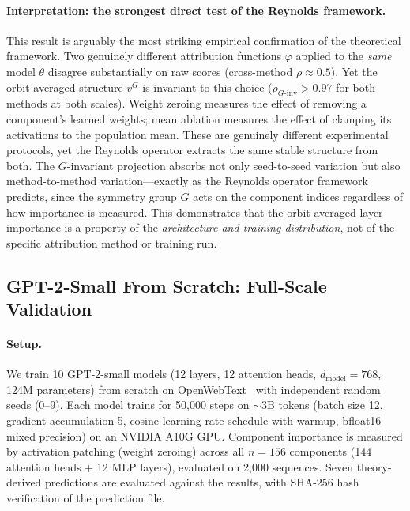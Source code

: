 \documentclass{article}
\begin{document}
\paragraph{Interpretation: the strongest direct test of the Reynolds framework.}
This result is arguably the most striking empirical confirmation of the theoretical framework. Two genuinely different attribution functions $\varphi$ applied to the \emph{same} model $\theta$ disagree substantially on raw scores (cross-method $\rho \approx 0.5$). Yet the orbit-averaged structure $v^G$ is invariant to this choice ($\rho_{G\text{-inv}} > 0.97$ for both methods at both scales). Weight zeroing measures the effect of removing a component's learned weights; mean ablation measures the effect of clamping its activations to the population mean. These are genuinely different experimental protocols, yet the Reynolds operator extracts the same stable structure from both. The $G$-invariant projection absorbs not only seed-to-seed variation but also method-to-method variation---exactly as the Reynolds operator framework predicts, since the symmetry group $G$ acts on the component indices regardless of how importance is measured. This demonstrates that the orbit-averaged layer importance is a property of the \emph{architecture and training distribution}, not of the specific attribution method or training run.

\subsection{GPT-2-Small From Scratch: Full-Scale Validation}
\label{sec:gpt2-from-scratch}

\paragraph{Setup.}
We train 10 GPT-2-small models (12 layers, 12 attention heads, $d_{\text{model}} = 768$, 124M parameters) from scratch on OpenWebText~\citep{gokaslan2019openwebtext} with independent random seeds (0--9). Each model trains for 50{,}000 steps on ${\sim}3$B tokens (batch size 12, gradient accumulation 5, cosine learning rate schedule with warmup, bfloat16 mixed precision) on an NVIDIA A10G GPU. Component importance is measured by activation patching (weight zeroing) across all $n = 156$ components (144 attention heads + 12 MLP layers), evaluated on 2{,}000 sequences. Seven theory-derived predictions are evaluated against the results, with SHA-256 hash verification of the prediction file.
\end{document}

